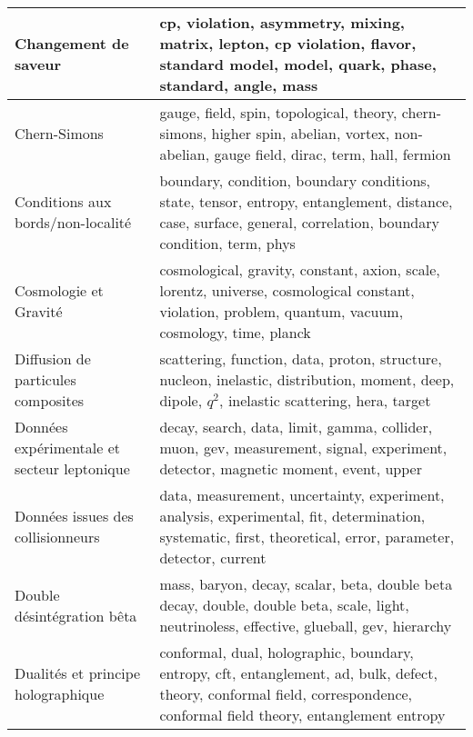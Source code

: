 \begin{longtable}[H]{p{}|p{}}
Changement de saveur                                            &                                                                         cp, violation, asymmetry, mixing, matrix, lepton, cp violation, flavor, standard model, model, quark, phase, standard, angle, mass \\ \midrule
Chern-Simons                                                    &                                                                  gauge, field, spin, topological, theory, chern-simons, higher spin, abelian, vortex, non-abelian, gauge field, dirac, term, hall, fermion \\ \midrule
Conditions aux bords/non-localité                               &                                              boundary, condition, boundary conditions, state, tensor, entropy, entanglement, distance, case, surface, general, correlation, boundary condition, term, phys \\ \midrule
Cosmologie et Gravité                                           &                                                      cosmological, gravity, constant, axion, scale, lorentz, universe, cosmological constant, violation, problem, quantum, vacuum, cosmology, time, planck \\ \midrule
Diffusion de particules composites                              &                                                           scattering, function, data, proton, structure, nucleon, inelastic, distribution, moment, deep, dipole, $q^2$, inelastic scattering, hera, target \\ \midrule
Données expérimentale et secteur leptonique                     &                                                                           decay, search, data, limit, gamma, collider, muon, gev, measurement, signal, experiment, detector, magnetic moment, event, upper \\ \midrule
Données issues des collisionneurs                               &                                                data, measurement, uncertainty, experiment, analysis, experimental, fit, determination, systematic, first, theoretical, error, parameter, detector, current \\ \midrule
Double désintégration bêta                                      &                                                                 mass, baryon, decay, scalar, beta, double beta decay, double, double beta, scale, light, neutrinoless, effective, glueball, gev, hierarchy \\ \midrule
Dualités et principe holographique                              &                                conformal, dual, holographic, boundary, entropy, cft, entanglement, ad, bulk, defect, theory, conformal field, correspondence, conformal field theory, entanglement entropy \\ \midrule

\end{longtable}
